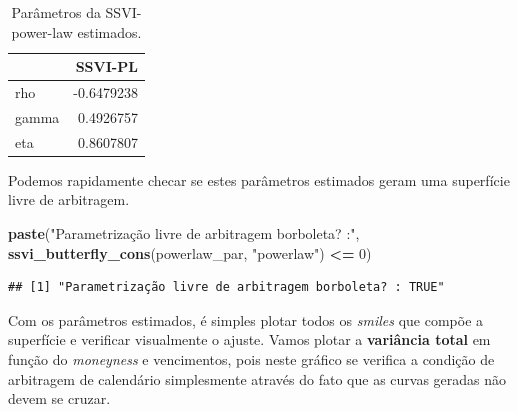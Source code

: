 \documentclass[]{book}
\newenvironment{Shaded}{\begin{snugshade}}{\end{snugshade}}
\newcommand{\KeywordTok}[1]{\textcolor[rgb]{0.13,0.29,0.53}{\textbf{#1}}}
\newcommand{\DataTypeTok}[1]{\textcolor[rgb]{0.13,0.29,0.53}{#1}}
\newcommand{\DecValTok}[1]{\textcolor[rgb]{0.00,0.00,0.81}{#1}}
\newcommand{\StringTok}[1]{\textcolor[rgb]{0.31,0.60,0.02}{#1}}
\newcommand{\OperatorTok}[1]{\textcolor[rgb]{0.81,0.36,0.00}{\textbf{#1}}}
\newcommand{\NormalTok}[1]{#1}
\theoremstyle{definition}
\theoremstyle{definition}
\theoremstyle{definition}
\theoremstyle{remark}
\begin{document}
\begin{Shaded}
\end{Shaded}

\begin{table}[t]

\caption{\label{tab:ssvi-cal}Parâmetros da SSVI-power-law estimados.}
\centering
\begin{tabular}{l|r}
\hline
  & SSVI-PL\\
\hline
rho & -0.6479238\\
\hline
gamma & 0.4926757\\
\hline
eta & 0.8607807\\
\hline
\end{tabular}
\end{table}

Podemos rapidamente checar se estes parâmetros estimados geram uma
superfície livre de arbitragem.

\begin{Shaded}
\begin{Highlighting}[]
\KeywordTok{paste}\NormalTok{(}\StringTok{"Parametrização livre de arbitragem borboleta? :"}\NormalTok{, }
      \KeywordTok{ssvi_butterfly_cons}\NormalTok{(powerlaw_par, }\StringTok{"powerlaw"}\NormalTok{) }\OperatorTok{<=}\StringTok{ }\DecValTok{0}\NormalTok{)}
\end{Highlighting}
\end{Shaded}

\begin{verbatim}
## [1] "Parametrização livre de arbitragem borboleta? : TRUE"
\end{verbatim}

Com os parâmetros estimados, é simples plotar todos os \emph{smiles} que
compõe a superfície e verificar visualmente o ajuste. Vamos plotar a
\textbf{variância total} em função do \emph{moneyness} e vencimentos,
pois neste gráfico se verifica a condição de arbitragem de calendário
simplesmente através do fato que as curvas geradas não devem se cruzar.
\end{document}

